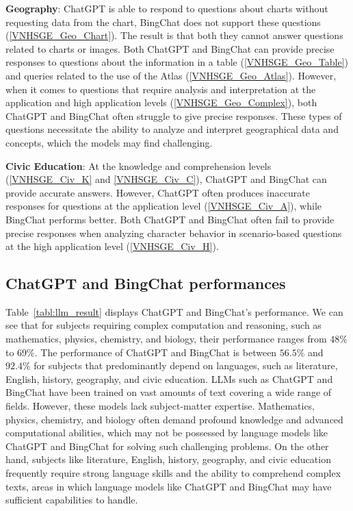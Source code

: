 \documentclass{article}
\begin{document}
{	\textbf{Geography}: ChatGPT is able to respond to questions about charts without requesting data from the chart, BingChat does not support these questions (\ref{VNHSGE_Geo_Chart}). The result is that both they cannot answer questions related to charts or images. Both ChatGPT and BingChat can provide precise responses to questions about the information in a table (\ref{VNHSGE_Geo_Table}) and queries related to the use of the Atlas (\ref{VNHSGE_Geo_Atlas}). However, when it comes to questions that require analysis and interpretation at the application and high application levels (\ref{VNHSGE_Geo_Complex}), both ChatGPT and BingChat often struggle to give precise responses. These types of questions necessitate the ability to analyze and interpret geographical data and concepts, which the models may find challenging.  
	
 
	
	\textbf{Civic Education}: At the knowledge and comprehension levels (\ref{VNHSGE_Civ_K} and \ref{VNHSGE_Civ_C}), ChatGPT and BingChat can provide accurate answers. However, ChatGPT often produces inaccurate responses for questions at the application level (\ref{VNHSGE_Civ_A}), while BingChat performs better. Both ChatGPT and BingChat often fail to provide precise responses when analyzing character behavior in scenario-based questions at the high application level (\ref{VNHSGE_Civ_H}).
	
	\subsection{ChatGPT and BingChat performances} 
	
	Table~\ref{tabl:llm_result} displays ChatGPT and BingChat's performance. We can see that for subjects requiring complex computation and reasoning, such as mathematics, physics, chemistry, and biology, their performance ranges from $48\%$ to $69\%$. The performance of ChatGPT and BingChat is between $56.5\%$ and $92.4\%$ for subjects that predominantly depend on languages, such as literature, English, history, geography, and civic education. LLMs such as ChatGPT and BingChat have been trained on vast amounts of text covering a wide range of fields. However, these models lack subject-matter expertise. Mathematics, physics, chemistry, and biology often demand profound knowledge and advanced computational abilities, which may not be possessed by language models like ChatGPT and BingChat for solving such challenging problems. On the other hand, subjects like literature, English, history, geography, and civic education frequently require strong language skills and the ability to comprehend complex texts, areas in which language models like ChatGPT and BingChat may have sufficient capabilities to handle.
	
}
\end{document}
